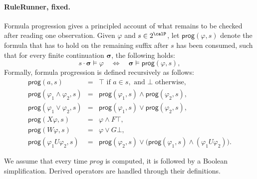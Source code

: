 \paragraph{RuleRunner, fixed.}
Formula progression gives a principled account of what remains to be checked after reading one observation. Given $\varphi$ and $s\in 2^\calP$, let $\mathsf{prog}(\varphi,s)$ denote the formula that has to hold on the remaining suffix after $s$ has been consumed, such that for every finite continuation $\boldsymbol{\sigma}$, the following holds: 
\[
s\cdot\boldsymbol{\sigma}\models\varphi
\quad\Longleftrightarrow\quad
\boldsymbol{\sigma}\models\mathsf{prog}(\varphi,s),
\]
\noindent
Formally, formula progression is defined recursively as follows:
\[
\begin{array}{rcl}
\mathsf{prog}(a,s) &=& \top \text{ if } a\in s,\text{ and } \bot \text{ otherwise},\\
\mathsf{prog}(\varphi_1\land\varphi_2,s) &=&
    \mathsf{prog}(\varphi_1,s)\land\mathsf{prog}(\varphi_2,s),\\
\mathsf{prog}(\varphi_1\lor\varphi_2,s) &=&
    \mathsf{prog}(\varphi_1,s)\lor\mathsf{prog}(\varphi_2,s),\\
\mathsf{prog}(X\varphi,s) &=& \varphi \land F \top,\\
\mathsf{prog}(W\varphi,s) &=& \varphi \lor G \bot,\\
\mathsf{prog}(\varphi_1U\varphi_2,s) &=&
    \mathsf{prog}(\varphi_2,s)\lor
    \bigl(\mathsf{prog}(\varphi_1,s)\land(\varphi_1U\varphi_2)\bigr).
\end{array}
\]

\noindent 
We assume that every time $prog$ is computed, it is followed by a Boolean simplification. Derived operators are handled through their definitions.


